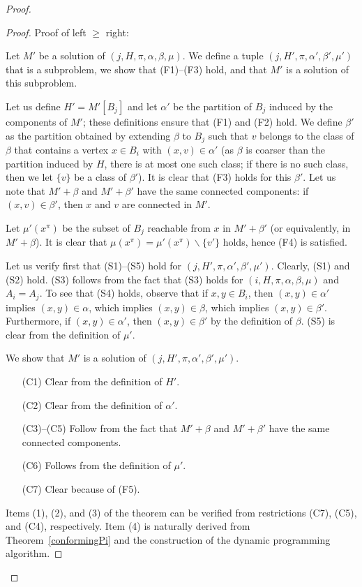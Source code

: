 \begin{proof}
\begin{proof}
Proof of left \(\geq\) right:

Let \(M'\) be a solution of \((j, H, \pi, \alpha, \beta, \mu)\). We define a tuple \((j, H', \pi, \alpha', \beta', \mu')\) that is a subproblem, we show that (F1)–(F3) hold, and that \(M'\) is a solution of this subproblem.

Let us define \(H' = M'[B_j]\) and let \(\alpha'\) be the partition of \(B_j\) induced by the components of \(M'\); these definitions ensure that (F1) and (F2) hold. We define \(\beta'\) as the partition obtained by extending \(\beta\) to \(B_j\) such that \(v\) belongs to the class of \(\beta\) that contains a vertex \(x \in B_i\) with \((x, v) \in \alpha'\) (as \(\beta\) is coarser than the partition induced by \(H\), there is at most one such class; if there is no such class, then we let \(\{v\}\) be a class of \(\beta'\)). It is clear that (F3) holds for this \(\beta'\). Let us note that \(M' + \beta\) and \(M' + \beta'\) have the same connected components: if \((x, v) \in \beta'\), then \(x\) and \(v\) are connected in \(M'\). 

Let \(\mu'(x^\pi)\) be the subset of \(B_j\) reachable from \(x\) in \(M' + \beta'\) (or equivalently, in \(M' + \beta\)). It is clear that \(\mu(x^\pi) = \mu'(x^\pi) \backslash \{v'\}\) holds, hence (F4) is satisfied.

Let us verify first that (S1)–(S5) hold for \((j, H', \pi, \alpha', \beta', \mu')\). Clearly, (S1) and (S2)  hold. (S3) follows from the fact that (S3) holds for \((i, H, \pi, \alpha, \beta, \mu)\) and \(A_i = A_j\). To see that (S4) holds, observe that if \(x, y \in B_i\), then \((x, y) \in \alpha'\) implies \((x, y) \in \alpha\), which implies \((x, y) \in \beta\), which implies \((x, y) \in \beta'\). Furthermore, if \((x, y) \in \alpha'\), then \((x, y) \in \beta'\) by the definition of \(\beta\). (S5) is clear from the definition of \(\mu'\).

We show that \(M'\) is a solution of \((j, H', \pi, \alpha', \beta', \mu')\).

\begin{itemize}
    \item[(C1)] Clear from the definition of \(H'\).
    \item[(C2)] Clear from the definition of \(\alpha'\).
    \item[(C3)–(C5)] Follow from the fact that \(M' + \beta\) and \(M' + \beta'\) have the same connected components.
    \item[(C6)] Follows from the definition of \(\mu'\).
    \item[(C7)] Clear because of (F5).
\end{itemize}

Items (1), (2), and (3) of the theorem can be verified from restrictions (C7), (C5), and (C4), respectively.  
Item (4) is naturally derived from Theorem~\ref{conformingPi} and the construction of the dynamic programming algorithm.

\end{proof}

\end{proof}


